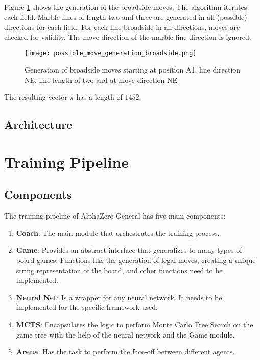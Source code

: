 \begin{enumerate}
          Figure \ref{possible_move_generation_broadside} shows the generation of the broadside moves. The algorithm iterates each field. Marble lines of length two and three are generated in all (possible) directions for each field. For each line broadside in all directions, moves are checked for validity. The move direction of the marble line direction is ignored.

          \begin{figure}
              \centering
              \texttt{[image: possible\_move\_generation\_broadside.png]}
              \caption{Generation of broadside moves starting at position A1, line direction NE, line length of two and at move direction NE}
              \label{possible_move_generation_broadside}
          \end{figure}

          The resulting vector $\pi$ has a length of $1452$.
\end{enumerate}

\subsection{Architecture}
\label{neural_network_architecture}
\section{Training Pipeline}
\subsection{Components}
\label{components}

The training pipeline of AlphaZero General has five main components:
\begin{enumerate}
    \item \textbf{Coach}: The main module that orchestrates the training process.
    \item \textbf{Game}: Provides an abstract interface that generalizes to many types of board games. Functions like the generation of legal moves, creating a unique string representation of the board, and other functions need to be implemented.
    \item \textbf{Neural Net}: Is a wrapper for any neural network. It needs to be implemented for the specific framework used.
    \item \textbf{MCTS}: Encapsulates the logic to perform Monte Carlo Tree Search on the game tree with the help of the neural network and the Game module.
    \item \textbf{Arena}: Has the task to perform the face-off between different agents.
\end{enumerate}

